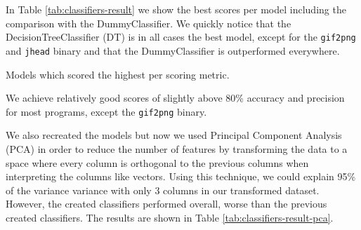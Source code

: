 In Table \ref{tab:classifiers-result} we show the best scores per model including the comparison with the DummyClassifier. We quickly notice that the DecisionTreeClassifier (DT) is in all cases the best model, except for the \texttt{gif2png} and \texttt{jhead} binary and that the DummyClassifier is outperformed everywhere.
\begin{table}[H]
\centering

\caption{Models which scored the highest per scoring metric.}\label{tab:classifiers-result}
\end{table}
We achieve relatively good scores of slightly above 80\% accuracy and precision for most programs, except the \texttt{gif2png} binary. 

We also recreated the models but now we used Principal Component Analysis (PCA) in order to reduce the number of features by transforming the data to a space where every column is orthogonal to the previous columns when interpreting the columns like vectors. Using this technique, we could explain 95\% of the variance variance with only 3 columns in our transformed dataset. However, the created classifiers performed overall, worse than the previous created classifiers. The results are shown in Table \ref{tab:classifiers-result-pca}.

